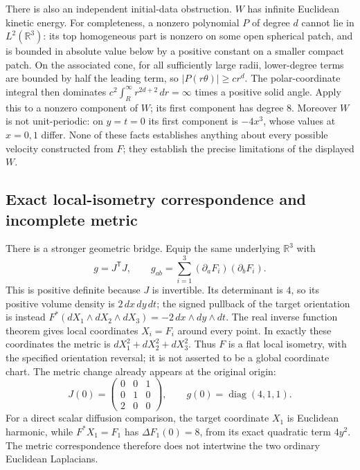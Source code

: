 There is also an independent initial-data obstruction.  $W$ has infinite
Euclidean kinetic energy.  For completeness, a nonzero polynomial $P$ of
degree $d$ cannot lie in $L^2(\mathbb R^3)$: its top homogeneous part is
nonzero on some open spherical patch, and is bounded in absolute value
below by a positive constant on a smaller compact patch.  On the associated
cone, for all sufficiently large radii, lower-degree terms are bounded by
half the leading term, so $|P(r\theta)|\ge c r^d$.
The polar-coordinate integral then dominates
$c^2\int_R^\infty r^{2d+2}\,dr=\infty$ times a positive solid angle.
Apply this to a nonzero component of $W$; its first component has degree $8$.
Moreover $W$ is not unit-periodic: on $y=t=0$ its first component is
$-4x^3$, whose values at $x=0,1$ differ.  None of these facts establishes
anything about every possible velocity constructed from $F$; they establish
the precise limitations of the displayed $W$.

\subsection{Exact local-isometry correspondence and incomplete metric}
There is a stronger geometric bridge.  Equip the same underlying
$\mathbb R^3$ with
\begin{equation}
 g=J^{\mathsf T}J,
 \qquad g_{ab}=\sum_{i=1}^3(\partial_aF_i)(\partial_bF_i).
 \label{eq:s6b:metric}
\end{equation}
This is positive definite because $J$ is invertible.  Its determinant is $4$,
so its positive volume density is $2\,dx\,dy\,dt$; the signed pullback of
the target orientation is instead $F^*(dX_1\wedge dX_2\wedge dX_3)
=-2\,dx\wedge dy\wedge dt$.  The real inverse function theorem gives
local coordinates $X_i=F_i$ around every point.  In exactly these coordinates
the metric is $dX_1^2+dX_2^2+dX_3^2$.  Thus $F$ is a flat local isometry,
with the specified orientation reversal; it is not asserted to be a global
coordinate chart.
The metric change already appears at the original origin:
\[
 J(0)=\begin{pmatrix}0&0&1\\0&1&0\\2&0&0\end{pmatrix},
 \qquad g(0)=\operatorname{diag}(4,1,1).
\]
For a direct scalar diffusion comparison, the target coordinate $X_1$
is Euclidean harmonic, while $F^*X_1=F_1$ has
$\Delta F_1(0)=8$, from its exact quadratic term $4y^2$.
The metric correspondence therefore does not intertwine the two
ordinary Euclidean Laplacians.

